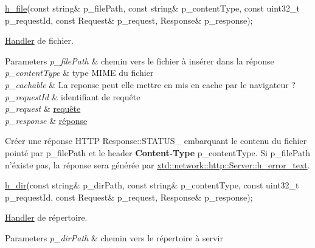 \begin{DoxyItemize}
\begin{DoxyCode}
\hyperlink{classxtd_1_1network_1_1http_1_1Server_a4358a20d2246a84f67d299f385c5bce8}{h\_file}(\textcolor{keyword}{const} \textcolor{keywordtype}{string}& p\_filePath, \textcolor{keyword}{const} \textcolor{keywordtype}{string}& p\_contentType, \textcolor{keyword}{const} uint32\_t p\_requestId, \textcolor{keyword}{const} 
      Request& p\_request, Response& p\_response); 
\end{DoxyCode}
 \hyperlink{classxtd_1_1network_1_1http_1_1Server_1_1Handler}{Handler} de fichier. 
\begin{DoxyParams}{Parameters}
{\em p\-\_\-file\-Path} & chemin vers le fichier à insérer dans la réponse \\
\hline
{\em p\-\_\-content\-Type} & type M\-I\-M\-E du fichier \\
\hline
{\em p\-\_\-cachable} & La reponse peut elle mettre en mis en cache par le navigateur ? \\
\hline
{\em p\-\_\-request\-Id} & identifiant de requête \\
\hline
{\em p\-\_\-request} & \hyperlink{classxtd_1_1network_1_1http_1_1Request}{requête} \\
\hline
{\em p\-\_\-response} & \hyperlink{classxtd_1_1network_1_1http_1_1Response}{réponse}\\
\hline
\end{DoxyParams}
Créer une réponse H\-T\-T\-P Response\-::\-S\-T\-A\-T\-U\-S\-\_ embarquant le contenu du fichier pointé par p\-\_\-file\-Path et le header {\bfseries Content-\/\-Type} p\-\_\-content\-Type. Si p\-\_\-file\-Path n'éxiste pas, la réponse sera générée par \hyperlink{classxtd_1_1network_1_1http_1_1Server_a39656db929894be1af465c0409c22f35}{xtd\-::network\-::http\-::\-Server\-::h\-\_\-error\-\_\-text}.
\item 
\begin{DoxyCode}
\hyperlink{classxtd_1_1network_1_1http_1_1Server_a71d7415223786f5451ef36f62c91782e}{h\_dir}(\textcolor{keyword}{const} \textcolor{keywordtype}{string}& p\_dirPath, \textcolor{keyword}{const} \textcolor{keywordtype}{string}& p\_contentType, \textcolor{keyword}{const} uint32\_t p\_requestId, \textcolor{keyword}{const} Request&
       p\_request, Response& p\_response); 
\end{DoxyCode}
 \hyperlink{classxtd_1_1network_1_1http_1_1Server_1_1Handler}{Handler} de répertoire. 
\begin{DoxyParams}{Parameters}
{\em p\-\_\-dir\-Path} & chemin vers le répertoire à servir \\

\end{DoxyParams}
\end{DoxyItemize}
